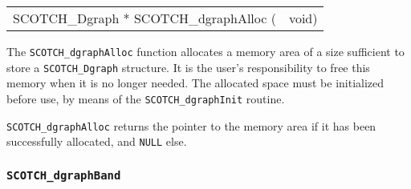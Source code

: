 \begin{itemize}
\progsyn

{\tt\begin{tabular}{l@{}l}
SCOTCH\_Dgraph * SCOTCH\_dgraphAlloc ( & void)
\end{tabular}}

\progdes

The {\tt SCOTCH\_dgraphAlloc} function allocates a memory area of a
size sufficient to store a {\tt SCOTCH\_\lbt Dgraph} structure. It is
the user's responsibility to free this memory when it is no longer
needed. The allocated space must be initialized before use, by means
of the {\tt SCOTCH\_\lbt dgraph\lbt Init} routine.

\progret

{\tt SCOTCH\_dgraphAlloc} returns the pointer to the memory area if it
has been successfully allocated, and {\tt NULL} else.
\end{itemize}

\subsubsection{{\tt SCOTCH\_dgraphBand}}

